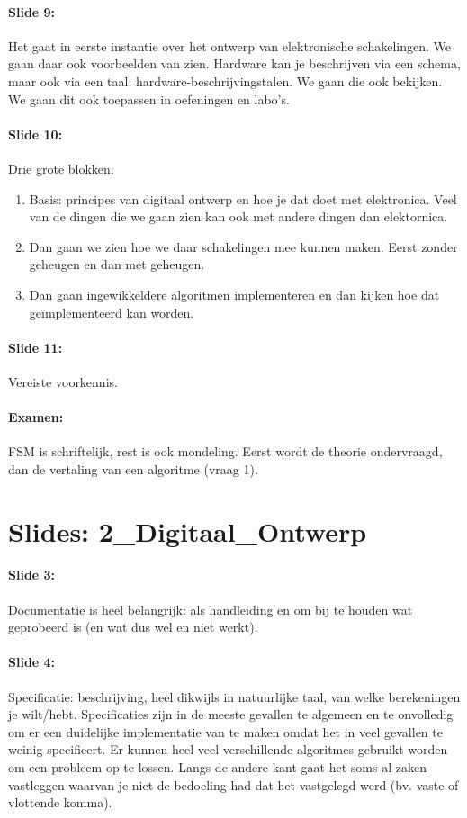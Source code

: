 \documentclass[10pt,a4paper]{book}
\begin{document}
\paragraph{Slide 9:} Het gaat in eerste instantie over het ontwerp van elektronische schakelingen. We gaan daar ook voorbeelden van zien. Hardware kan je beschrijven via een schema, maar ook via een taal: hardware-beschrijvingstalen. We gaan die ook bekijken. We gaan dit ook toepassen in oefeningen en labo's.

\paragraph{Slide 10:} Drie grote blokken:
\begin{enumerate}
\item Basis: principes van digitaal ontwerp en hoe je dat doet met elektronica. Veel van de dingen die we gaan zien kan ook met andere dingen dan elektornica. 
\item Dan gaan we zien hoe we daar schakelingen mee kunnen maken. Eerst zonder geheugen en dan met geheugen. 
\item Dan gaan ingewikkeldere algoritmen implementeren en dan kijken hoe dat ge\"implementeerd kan worden.
\end{enumerate}

\paragraph{Slide 11:} Vereiste voorkennis.

\paragraph{Examen:} FSM is schriftelijk, rest is ook mondeling. Eerst wordt de theorie ondervraagd, dan de vertaling van een algoritme (vraag 1).

\section{Slides: 2\_Digitaal\_Ontwerp}

\paragraph{Slide 3:} Documentatie is heel belangrijk: als handleiding en om bij te houden wat geprobeerd is (en wat dus wel en niet werkt).

\paragraph{Slide 4:} Specificatie: beschrijving, heel dikwijls in natuurlijke taal, van welke berekeningen je wilt/hebt. Specificaties zijn in de meeste gevallen te algemeen en te onvolledig om er een duidelijke implementatie van te maken omdat het in veel gevallen te weinig specifieert. Er kunnen heel veel verschillende algoritmes gebruikt worden om een probleem op te lossen. Langs de andere kant gaat het soms al zaken vastleggen waarvan je niet de bedoeling had dat het vastgelegd werd (bv. vaste of vlottende komma). 
\end{document}
